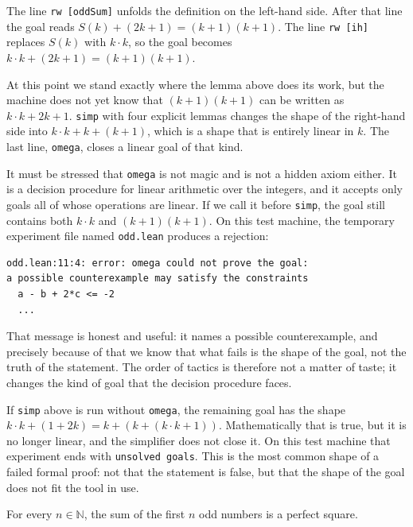 The line \texttt{rw [oddSum]} unfolds the definition on the left-hand side. After that line the goal
reads $S(k)+(2k+1)=(k+1)(k+1)$. The line \texttt{rw [ih]} replaces $S(k)$ with $k\cdot k$, so the
goal becomes $k\cdot k+(2k+1)=(k+1)(k+1)$.

At this point we stand exactly where the lemma above does its work, but the machine does not yet know
that $(k+1)(k+1)$ can be written as $k\cdot k+2k+1$. \texttt{simp} with four explicit lemmas changes
the shape of the right-hand side into $k\cdot k+k+(k+1)$, which is a shape that is entirely linear in
$k$. The last line, \texttt{omega}, closes a linear goal of that kind.

It must be stressed that \texttt{omega} is not magic and is not a hidden axiom either. It is a
decision procedure for linear arithmetic over the integers, and it accepts only goals all of whose
operations are linear. If we call it before \texttt{simp}, the goal still contains both $k\cdot k$
and $(k+1)(k+1)$. On this test machine, the temporary experiment file named \texttt{odd.lean}
produces a rejection:

\begin{verbatim}
odd.lean:11:4: error: omega could not prove the goal:
a possible counterexample may satisfy the constraints
  a - b + 2*c <= -2
  ...
\end{verbatim}

That message is honest and useful: it names a possible counterexample, and precisely because of that
we know that what fails is the shape of the goal, not the truth of the statement. The order of
tactics is therefore not a matter of taste; it changes the kind of goal that the decision procedure
faces.

\begin{catatan}
If \texttt{simp} above is run without \texttt{omega}, the remaining goal has the shape
$k\cdot k+(1+2k)=k+(k+(k\cdot k+1))$. Mathematically that is true, but it is no longer linear, and
the simplifier does not close it. On this test machine that experiment ends with
\texttt{unsolved goals}. This is the most common shape of a failed formal proof: not that the
statement is false, but that the shape of the goal does not fit the tool in use.
\end{catatan}

\begin{akibat}
For every $n\in\mathbb{N}$, the sum of the first $n$ odd numbers is a perfect square.
\end{akibat}

